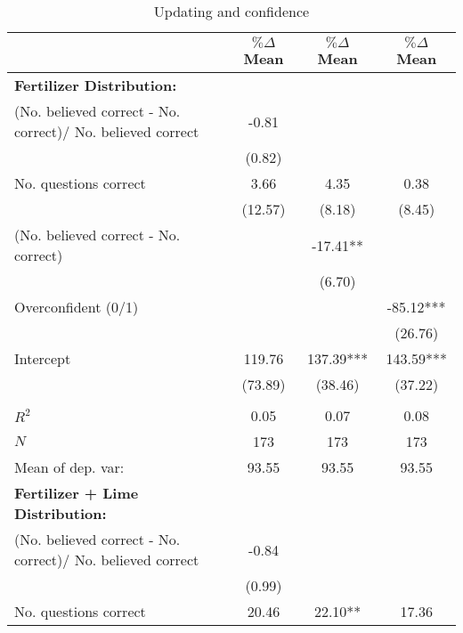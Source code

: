 \begin{table}[htbp]
\centering
\hspace*{-1.2cm}
\begin{threeparttable}
\caption{Updating and confidence}
\label{tab:D5fert}
\begin{tabular}{l ccc}
\hline
\hline
 & $\% \Delta$ Mean & $\% \Delta$ Mean & $\% \Delta$ Mean \\ \hline
\textbf{Fertilizer Distribution:}&               &               &               \\
(No. believed correct - No. correct)/ No. believed correct&       -0.81   &               &               \\
                    &      (0.82)   &               &               \\
No. questions correct&        3.66   &        4.35   &        0.38   \\
                    &     (12.57)   &      (8.18)   &      (8.45)   \\
(No. believed correct - No. correct)&               &      -17.41** &               \\
                    &               &      (6.70)   &               \\
Overconfident (0/1) &               &               &      -85.12***\\
                    &               &               &     (26.76)   \\
Intercept           &      119.76   &      137.39***&      143.59***\\
                    &     (73.89)   &     (38.46)   &     (37.22)   \\
                    &               &               &               \\
$R^2$               &        0.05   &        0.07   &        0.08   \\
$N$                 &         173   &         173   &         173   \\
Mean of dep. var:   &       93.55   &       93.55   &       93.55   \\
\hline
%
\textbf{Fertilizer + Lime Distribution:}&               &               &               \\
(No. believed correct - No. correct)/ No. believed correct&       -0.84   &               &               \\
                    &      (0.99)   &               &               \\
No. questions correct&       20.46   &       22.10** &       17.36   \\

\end{tabular}
\end{threeparttable}
\end{table}
